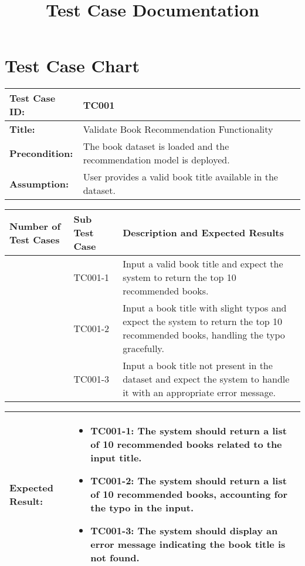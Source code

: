 \documentclass{article}
\title{Test Case Documentation}
\begin{document}
\maketitle

\section*{Test Case Chart}

\noindent
\begin{tabularx}{\textwidth}{|>{\raggedright\arraybackslash}p{4cm}|X|}
    \hline
    \textbf{Test Case ID:} & TC001 \\ \hline
    \textbf{Title:} & Validate Book Recommendation Functionality \\ \hline
    \textbf{Precondition:} & The book dataset is loaded and the recommendation model is deployed. \\ \hline
    \textbf{Assumption:} & User provides a valid book title available in the dataset. \\ \hline
\end{tabularx}

\noindent
\begin{tabularx}{\textwidth}{|>{\centering\arraybackslash}p{3cm}|>{\centering\arraybackslash}p{3cm}|X|}
    \hline
    \textbf{Number of Test Cases} & \textbf{Sub Test Case} & \textbf{Description and Expected Results} \\ \hline
    1 & TC001-1 & Input a valid book title and expect the system to return the top 10 recommended books. \\ \hline
    2 & TC001-2 & Input a book title with slight typos and expect the system to return the top 10 recommended books, handling the typo gracefully. \\ \hline
    3 & TC001-3 & Input a book title not present in the dataset and expect the system to handle it with an appropriate error message. \\ \hline
\end{tabularx}

\noindent
\begin{tabularx}{\textwidth}{|>{\raggedright\arraybackslash}p{4cm}|X|}
    \hline
    \textbf{Expected Result:} & 
    \begin{itemize}
        \item TC001-1: The system should return a list of 10 recommended books related to the input title.
        \item TC001-2: The system should return a list of 10 recommended books, accounting for the typo in the input.
        \item TC001-3: The system should display an error message indicating the book title is not found.
    \end{itemize}
    \\ \hline
\end{tabularx}
\end{document}

